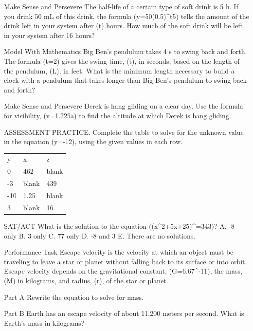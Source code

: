 \documentclass{article}
\newenvironment{practice}[2]{}{}        %
\newcommand{\answer}[1]{}               %
\newcommand{\placeholder}[2]{}          %
\newcommand{\te}[1]{}                   %
\begin{document}
\begin{practice}{41}{3}
Make Sense and Persevere The half-life of a certain type of soft drink is 5 h. If you drink 50 mL of this drink, the formula (y=50(0.5)^{\frac t5}) tells the amount of the drink left in your system after (t) hours. How much of the soft drink will be left in your system after 16 hours?
\answer{about 5.44 mL}
\end{practice}
\begin{practice}{42}{2}
Model With Mathematics Big Ben's pendulum takes 4 s to swing back and forth. The formula (t=2\pi{}) gives the swing time, (t), in seconds, based on the length of the pendulum, (L), in feet. What is the minimum length necessary to build a clock with a pendulum that takes longer than Big Ben's pendulum to swing back and forth?
\answer{13 ft}
\te{Printed answer rounds to whole feet; the strict inequality gives (L>\frac{128}{\pi^2}) ft.}
\end{practice}
\begin{practice}{43}{2}
Make Sense and Persevere Derek is hang gliding on a clear day. Use the formula for visibility, (v=1.225\sqrt a) to find the altitude at which Derek is hang gliding.
\placeholder{illustration}{Hang glider above landscape with callouts: visibility, v=67.1 miles; Distance to ground=a feet.}
\answer{(\approx3,000) ft}
\end{practice}
\begin{practice}{44}{1}
ASSESSMENT PRACTICE. Complete the table to solve for the unknown value in the equation (y=-12), using the given values in each row.
\begin{tabular}{lll}
y & x & z \\
0 & 462 & blank \\
-3 & blank & 439 \\
-10 & 1.25 & blank \\
3 & blank & 16 \\
\end{tabular}
\answer{804; 145; 5.5; 1,679.5.}
\end{practice}
\begin{practice}{45}{1}
SAT/ACT What is the solution to the equation ((x^2+5x+25)^{}=343)?
A. -8 only
B. 3 only
C. 77 only
D. -8 and 3
E. There are no solutions.
\answer{D}
\end{practice}
\begin{practice}{46}{2}
Performance Task Escape velocity is the velocity at which an object must be traveling to leave a star or planet without falling back to its surface or into orbit. Escape velocity depends on the gravitational constant, (G=6.67^{-11}), the mass, (M) in kilograms, and radius, (r), of the star or planet.
\placeholder{illustration}{Earth surface beneath starry dark-blue sky; white trajectory curves upward from a bright dot on Earth toward a small red object. Callouts: Escape velocity: (v=\sqrt{\frac{2GM}r}); Earth's radius=6,371,000 m.}
Part A Rewrite the equation to solve for mass.
\answer{Part A (M=\frac{v^2r}{2G})}
Part B Earth has an escape velocity of about 11,200 meters per second. What is Earth's mass in kilograms?
\answer{Part B (M\approx5.99\times10^{24})}
\end{practice}
\end{document}
